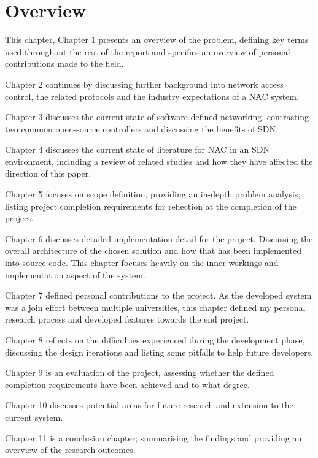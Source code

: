 \section{Overview}
This chapter, Chapter 1 presents an overview of the problem, defining key terms used throughout the rest of the report and specifies an overview of personal contributions made to the field. 

Chapter 2 continues by discussing further background into network access control, the related protocols and the industry expectations of a NAC system. 

Chapter 3 discusses the current state of software defined networking, contrasting two common open-source controllers and discussing the benefits of SDN. 

Chapter 4 discusses the current state of literature for NAC in an SDN environment, including a review of related studies and how they have affected the direction of this paper. 

Chapter 5 focuses on scope definition, providing an in-depth problem analysis; listing project completion requirements for reflection at the completion of the project. 

Chapter 6 discusses detailed implementation detail for the project. Discussing the overall architecture of the chosen solution and how that has been implemented into source-code. This chapter focuses heavily on the inner-workings and implementation aspect of the system.

Chapter 7 defined personal contributions to the project. As the developed system was a join effort between multiple universities, this chapter defined my personal research process and developed features towards the end project.

Chapter 8 reflects on the difficulties experienced during the development phase, discussing the design iterations and listing some pitfalls to help future developers.

Chapter 9 is an evaluation of the project, assessing whether the defined completion requirements have been achieved and to what degree.

Chapter 10 discusses potential areas for future research and extension to the current system.

Chapter 11 is a conclusion chapter; summarising the findings and providing an overview of the research outcomes.